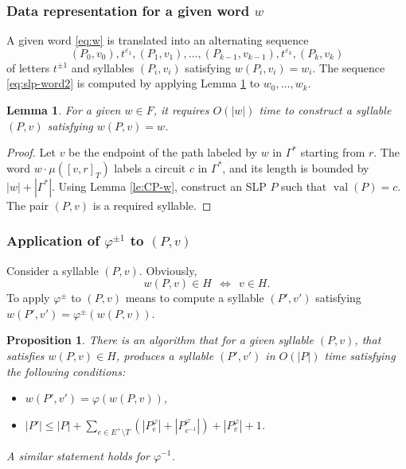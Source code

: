 \documentclass[12pt,oneside]{amsart}
\newtheorem{lemma}[theorem]{Lemma}
\newtheorem{proposition}[theorem]{Proposition}
\theoremstyle{definition}
\theoremstyle{case}
\DeclareMathOperator{\val}{val}
\begin{document}
\subsubsection{Data representation for a given word $w$}

A given word  \eqref{eq:w} is translated into an alternating sequence
\begin{equation}\label{eq:slp-word2}
(P_0,v_{0}), t^{\varepsilon_1},
(P_1,v_{1}), \dots,
(P_{k-1},v_{k-1}), t^{\varepsilon_k},
(P_k,v_{k})
\end{equation}
of letters $t^{\pm 1}$ and syllables $(P_i,v_i)$ satisfying
$
w(P_i,v_i) = w_i.
$
The sequence \eqref{eq:slp-word2} is computed by applying 
Lemma \ref{le:CP-w2} to $w_0,\dots,w_k$.


\begin{lemma}\label{le:CP-w2}
For a given $w\in F$, it requires $O(|w|)$ time to construct
a syllable $(P,v)$ satisfying $w(P,v) = w$.
\end{lemma}

\begin{proof}
Let $v$ be the endpoint of the path labeled by $w$ in $\Gamma^\ast$ 
starting from $r$.
The word $w\cdot \mu([v,r]_T)$ labels a circuit $c$ in $\Gamma^\ast$,
and its length is bounded by $|w|+|\Gamma^\ast|$.
Using Lemma \ref{le:CP-w}, construct an SLP $P$ such that $\val(P)=c$.
The pair $(P,v)$ is a required syllable.
\end{proof}

\subsubsection{Application of $\varphi^{\pm1}$ to $(P,v)$}

Consider a syllable $(P,v)$. Obviously,
$$
w(P,v)\in H\ \ \Leftrightarrow\ \ v\in H.
$$
To apply $\varphi^\pm$ to $(P,v)$ means to compute a syllable $(P',v')$
satisfying $w(P',v')=\varphi^\pm(w(P,v))$.

\begin{proposition}\label{pr:apply-phi2}
There is an algorithm that
for a given syllable $(P,v)$, that satisfies $w(P,v)\in H$,
produces a syllable $(P',v')$ in $O(|P|)$ time
satisfying the following conditions:
\begin{itemize}
\item[(a)]
$w(P',v')=\varphi(w(P,v))$,
\item[(b)]
$|P'|\le |P| + \sum_{e\in E^+\setminus T}
(|P_e^\varphi|+
|P_{e^{-1}}^\varphi|) 
+|P_v^\varphi|+1$.
\end{itemize}
A similar statement holds for $\varphi^{-1}$.
\end{proposition}
\end{document}
